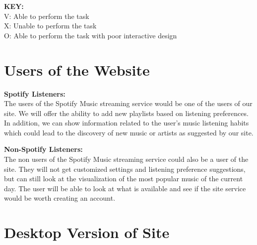 \documentclass[letter, 11pt]{article}
\begin{document}
\textbf{KEY:}\\
\indent
V: Able to perform the task \\
\indent
X: Unable to perform the task \\
\indent
O: Able to perform the task with poor interactive design

\section*{Users of the Website}
\noindent
\textbf{Spotify Listeners:}\\
The users of the Spotify Music streaming service would be one of the users of our site. We will offer the ability to add new playlists based on listening preferences. In addition, we can show information related to the user's music listening habits which could lead to the discovery of new music or artists as suggested by our site.

\noindent
\textbf{Non-Spotify Listeners:}\\
The non users of the Spotify Music streaming service could also be a user of the site. They will not get customized settings and listening preference suggestions, but can still look at the visualization of the most popular music of the current day. The user will be able to look at what is available and see if the site service would be worth creating an account.

\section*{Desktop Version of Site}
\end{document}
